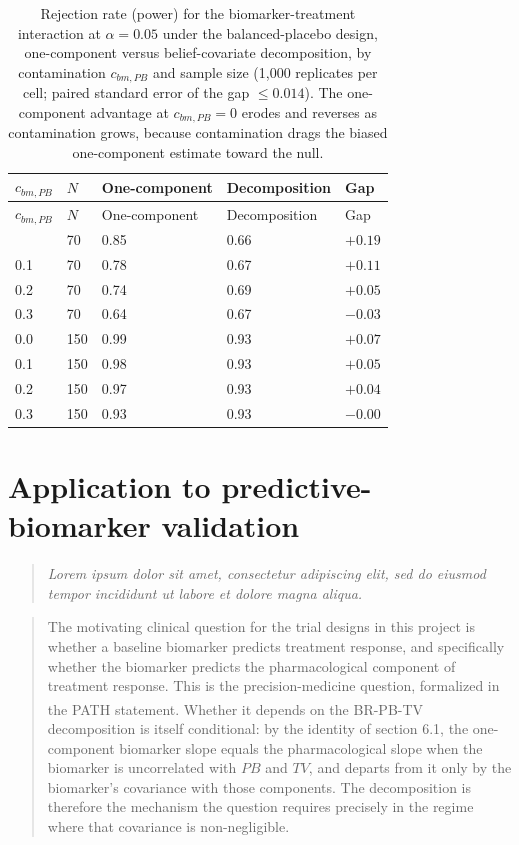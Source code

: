 \documentclass[
  11pt,
]{article}
\newenvironment{rgt}{%
  \begin{quote}\small\itshape\color[RGB]{20,60,160}}{%
  \end{quote}}
\newenvironment{orig}{%
  \begin{quote}\normalsize\color[gray]{0.55}}{%
  \end{quote}}
\begin{document}
\begin{longtable}[]{@{}lllll@{}}
\caption{\label{tab:studyc-power} Rejection rate (power) for the
biomarker-treatment interaction at \(\alpha = 0.05\) under the
balanced-placebo design, one-component versus belief-covariate
decomposition, by contamination \(c_{bm,PB}\) and sample size (1,000
replicates per cell; paired standard error of the gap \(\le 0.014\)). The
one-component advantage at \(c_{bm,PB}=0\) erodes and reverses as
contamination grows, because contamination drags the biased
one-component estimate toward the null.}\tabularnewline
\toprule\noalign{}
\(c_{bm,PB}\) & \(N\) & One-component & Decomposition & Gap \\
\midrule\noalign{}
\endfirsthead
\toprule\noalign{}
\(c_{bm,PB}\) & \(N\) & One-component & Decomposition & Gap \\
\midrule\noalign{}
\endhead
\bottomrule\noalign{}
\endlastfoot
0.0 & 70 & 0.85 & 0.66 & \(+0.19\) \\
0.1 & 70 & 0.78 & 0.67 & \(+0.11\) \\
0.2 & 70 & 0.74 & 0.69 & \(+0.05\) \\
0.3 & 70 & 0.64 & 0.67 & \(-0.03\) \\
0.0 & 150 & 0.99 & 0.93 & \(+0.07\) \\
0.1 & 150 & 0.98 & 0.93 & \(+0.05\) \\
0.2 & 150 & 0.97 & 0.93 & \(+0.04\) \\
0.3 & 150 & 0.93 & 0.93 & \(-0.00\) \\
\end{longtable}

\section{Application to predictive-biomarker validation}\label{application-to-predictive-biomarker-validation}

\begin{rgt}
Lorem ipsum dolor sit amet, consectetur adipiscing elit, sed do eiusmod tempor incididunt ut labore et dolore magna aliqua.

\end{rgt}

\begin{orig}
The motivating clinical question for the trial designs in this
project is whether a baseline biomarker predicts treatment
response, and specifically whether the biomarker predicts the
pharmacological component of treatment response. This is the
precision-medicine question, formalized in the PATH statement\textsuperscript{}. Whether it depends on the BR-PB-TV decomposition
is itself conditional: by the identity of section 6.1, the one-component
biomarker slope equals the pharmacological slope when the biomarker
is uncorrelated with \(PB\) and \(TV\), and departs from it only by the
biomarker's covariance with those components. The decomposition is
therefore the mechanism the question requires precisely in the
regime where that covariance is non-negligible.

\end{orig}
\end{document}
